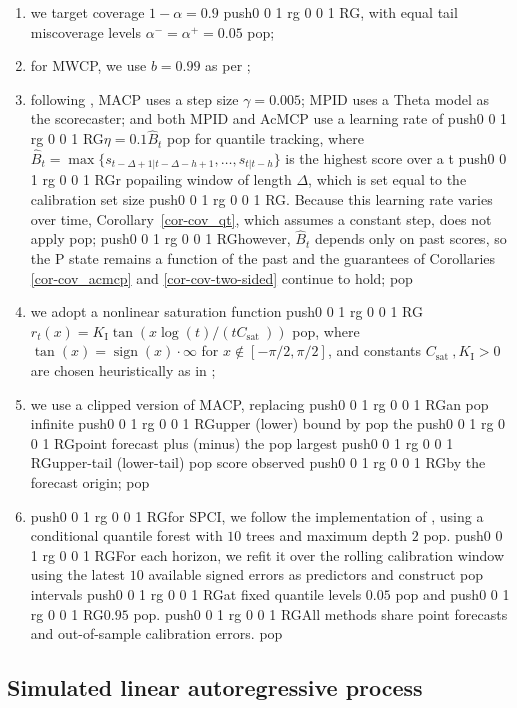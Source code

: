 \documentclass[
  american,
  12pt]{article}
\providecommand{\tightlist}{%
  \setlength{\itemsep}{0pt}\setlength{\parskip}{0pt}}
\theoremstyle{plain}
\theoremstyle{plain}
\theoremstyle{remark}
\newcommand{\CPTSadd}[1]{\ifmmode\else\leavevmode\fi\pdfcolorstack 0 push{0 0 1 rg 0 0 1 RG}#1\pdfcolorstack 0 pop}
\begin{document}
\begin{enumerate}
\def\labelenumi{(\alph{enumi})}
\tightlist
\item
  we target coverage \(1-\alpha=0.9\)\CPTSadd{, with equal tail miscoverage
  levels \(\alpha^{-}=\alpha^{+}=0.05\)};
\item
  for MWCP, we use \(b=0.99\) as per \citet{barber2023};
\item
  following \citet{angelopoulos2024}, MACP uses a step size
  \(\gamma=0.005\); MPID uses a Theta model as the scorecaster; and both
  MPID and AcMCP use a learning rate of \CPTSadd{\(\eta=0.1\hat{B}_t\)} for
  quantile tracking, where
  \(\hat{B}_t=\max\{s_{t-\Delta+1|t-\Delta-h+1}, \dots, s_{t|t-h}\}\) is
  the highest score over a t\CPTSadd{r}ailing window of length \(\Delta\), which
  is set equal to the calibration set size\CPTSadd{. Because this learning rate
  varies over time, Corollary~\ref{cor-cov_qt}, which assumes a constant
  step, does not apply}; \CPTSadd{however, \(\hat{B}_t\) depends only on past
  scores, so the P state remains a function of the past and the
  guarantees of Corollaries \ref{cor-cov_acmcp} and
  \ref{cor-cov-two-sided} continue to hold;}
\item
  we adopt a nonlinear saturation function
  \CPTSadd{\(r_t(x)=K_{\mathrm I} \tan \left(x \log (t) / (t C_{\text {sat }})\right)\)},
  where \(\tan (x)=\operatorname{sign}(x) \cdot \infty\) for
  \(x \notin[-\pi / 2, \pi / 2]\), and constants
  \(C_{\text {sat }}, K_{\mathrm{I}}>0\) are chosen heuristically as in
  \citet{angelopoulos2024};
\item
  we use a clipped version of MACP, replacing \CPTSadd{an} infinite \CPTSadd{upper (lower)
  bound by} the \CPTSadd{point forecast plus (minus) the} largest \CPTSadd{upper-tail
  (lower-tail)} score observed \CPTSadd{by the forecast origin;}
\item
  \CPTSadd{for SPCI, we follow the implementation of \citet{xu2023}, using a
  conditional quantile forest with \(10\) trees and maximum depth \(2\)}.
  \CPTSadd{For each horizon, we refit it over the rolling calibration window
  using the latest \(10\) available signed errors as predictors and
  construct} intervals \CPTSadd{at fixed quantile levels \(0.05\)} and \CPTSadd{\(0.95\)}.
  \CPTSadd{All methods share point forecasts and out-of-sample calibration
  errors.}
\end{enumerate}

\subsection{Simulated linear autoregressive process}\label{sec-simar}
\end{document}
